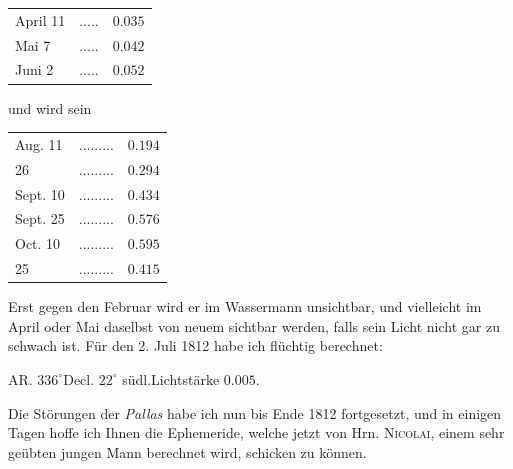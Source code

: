 \begin{center}\fontsize{10}{12}\selectfont\setlength{\tabcolsep}{4pt}\renewcommand{\arraystretch}{1.15}\begin{tabular}{llr}
April 11 & .\;.\;.\;.\;. & $0.035$\\
Mai 7 & .\;.\;.\;.\;. & $0.042$\\
Juni 2 & .\;.\;.\;.\;. & $0.052$\\
\end{tabular}\end{center}

\noindent und wird sein

\begin{center}\fontsize{10}{12}\selectfont\setlength{\tabcolsep}{4pt}\renewcommand{\arraystretch}{1.15}\begin{tabular}{llr}
Aug. 11 & .\;.\;.\;.\;.\;.\;.\;.\;. & $0.194$\\
26 & .\;.\;.\;.\;.\;.\;.\;.\;. & $0.294$\\
Sept. 10 & .\;.\;.\;.\;.\;.\;.\;.\;. & $0.434$\\
Sept. 25 & .\;.\;.\;.\;.\;.\;.\;.\;. & $0.576$\\
Oct. 10 & .\;.\;.\;.\;.\;.\;.\;.\;. & $0.595$\\
25 & .\;.\;.\;.\;.\;.\;.\;.\;. & $0.415$\\
\end{tabular}\end{center}

\noindent Erst gegen den Februar wird er im Wassermann unsichtbar, und vielleicht im April oder Mai daselbst von neuem sichtbar werden, falls sein Licht nicht gar zu schwach ist. Für den 2. Juli 1812 habe ich flüchtig berechnet:
\begin{center}AR. $336^\circ$\quad Decl. $22^\circ$ südl.\quad Lichtstärke $0.005$.\end{center}
\par{}

\par\indent Die Störungen der \emph{Pallas} habe ich nun bis Ende 1812 fortgesetzt, und in einigen Tagen hoffe ich Ihnen die Ephemeride, welche jetzt von Hrn. \textsc{Nicolai}, einem sehr geübten jungen Mann berechnet wird, schicken zu können.

